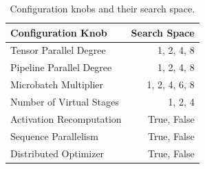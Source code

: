 \begin{table}[htbp]
\vspace{1em}
\centering
\begin{tabular}{l r}
\toprule
\textbf{Configuration Knob} & \textbf{Search Space} \\
\midrule
Tensor Parallel Degree & 1, 2, 4, 8 \\
Pipeline Parallel Degree & 1, 2, 4, 8 \\
Microbatch Multiplier & 1, 2, 4, 6, 8 \\
Number of Virtual Stages & 1, 2, 4 \\
Activation Recomputation & True, False \\
Sequence Parallelism & True, False \\
Distributed Optimizer & True, False \\
\bottomrule
\end{tabular}
\caption{Configuration knobs and their search space.}
\label{tab:eval-config-knobs}
\end{table}



